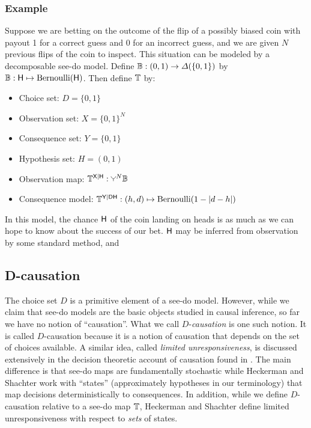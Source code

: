 \subsubsection{Example}

Suppose we are betting on the outcome of the flip of a possibly biased coin with payout 1 for a correct guess and 0 for an incorrect guess, and we are given $N$ previous flips of the coin to inspect. This situation can be modeled by a decomposable see-do model. Define $\mathbb{B}:(0,1)\to \Delta(\{0,1\})$ by $\mathbb{B}:\mathsf{H}\mapsto \mathrm{Bernoulli}(\mathsf{H})$. Then define ${\mathbb{T}}$ by:

\begin{itemize}
    \item Choice set: $D=\{0,1\}$
    \item Observation set: $X=\{0,1\}^N$
    \item Consequence set: $Y=\{0,1\}$
    \item Hypothesis set: $H=(0,1)$
    \item Observation map: ${\kernel{T}}^{\RV{X}|\RV{H}}:\splitter{0.1}^N\kernel{B}$
    \item Consequence model: ${\mathbb{T}}^{\mathsf{Y}|\mathsf{D}\mathsf{H}}:(h,d)\mapsto \mathrm{Bernoulli}(1-|d-h|)$
\end{itemize}

In this model, the chance $\mathsf{H}$ of the coin landing on heads is as much as we can hope to know about the success of our bet. $\mathsf{H}$ may be inferred from observation by some standard method, and 

\subsection{D-causation}

The choice set $D$ is a primitive element of a see-do model. However, while we claim that see-do models are the basic objects studied in causal inference, so far we have no notion of ``causation''. What we call $D$-\emph{causation} is one such notion. It is called $D$-causation because it is a notion of causation that depends on the set of choices available. A similar idea, called \emph{limited unresponsiveness}, is discussed extensively in the decision theoretic account of causation found in \citet{heckerman_decision-theoretic_1995}. The main difference is that see-do maps are fundamentally stochastic while Heckerman and Shachter work with ``states'' (approximately hypotheses in our terminology) that map decisions deterministically to consequences. In addition, while we define $D$-causation relative to a see-do map $\mathbb{T}$, Heckerman and Shachter define limited unresponsiveness with respect to \emph{sets} of states.

